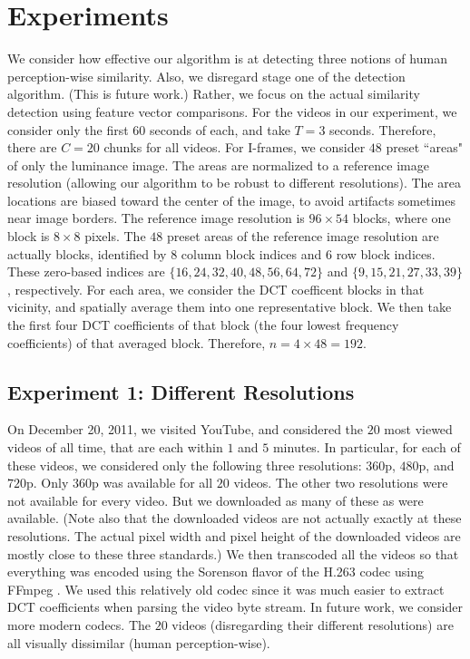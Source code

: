 \documentclass{article}
\begin{document}
\section{Experiments}
\label{section:Experiments}
We consider how effective our algorithm is at detecting three notions of human perception-wise similarity. Also, we disregard stage one of the detection algorithm. (This is future work.) Rather, we focus on the actual similarity detection using feature vector comparisons. For the videos in our experiment, we consider only the first $60$ seconds of each, and take $T = 3$ seconds. Therefore, there are $C = 20$ chunks for all videos. For I-frames, we consider $48$ preset ``areas" of only the luminance image. The areas are normalized to a reference image resolution (allowing our algorithm to be robust to different resolutions). The area locations are biased toward the center of the image, to avoid artifacts sometimes near image borders. The reference image resolution is $96 \times 54$ blocks, where one block is $8 \times 8$ pixels. The $48$ preset areas of the reference image resolution are actually blocks, identified by $8$ column block indices and $6$ row block indices. These zero-based indices are $\{16, 24, 32, 40, 48, 56, 64, 72\}$ and $\{9, 15, 21, 27, 33, 39\}$, respectively. For each area, we consider the DCT coefficent blocks in that vicinity, and spatially average them into one representative block. We then take the first four DCT coefficients of that block (the four lowest frequency coefficients) of that averaged block. Therefore, $n = 4 \times 48 = 192$.

\subsection{Experiment 1: Different Resolutions}
On December 20, 2011, we visited YouTube, and considered the $20$ most viewed videos of all time, that are each within $1$ and $5$ minutes. In particular, for each of these videos, we considered only the following three resolutions: $360$p, $480$p, and $720$p. Only $360$p was available for all $20$ videos. The other two resolutions were not available for every video. But we downloaded as many of these as were available. (Note also that the downloaded videos are not actually exactly at these resolutions. The actual pixel width and pixel height of the downloaded videos are mostly close to these three standards.) We then transcoded all the videos so that everything was encoded using the Sorenson flavor \cite{web:SWF} of the H.263 codec \cite{web:H.263} using FFmpeg \cite{web:FFmpeg}. We used this relatively old codec since it was much easier to extract DCT coefficients when parsing the video byte stream. In future work, we consider more modern codecs. The $20$ videos (disregarding their different resolutions) are all visually dissimilar (human perception-wise).
\end{document}
